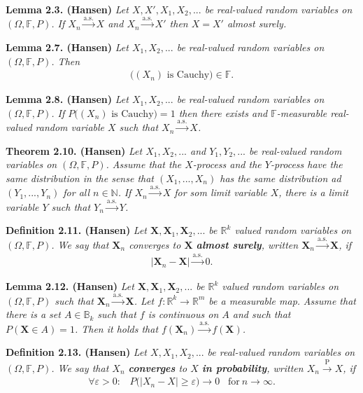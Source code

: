 \documentclass[a4paper,12pt,openany]{book}
\begin{document}
\textbf{Lemma 2.3. (Hansen)} \emph{Let \(X,X',X_1,X_2,...\) be real-valued random variables on \((\Omega,\mathbb{F},P)\). If \(X_n\stackrel{\text{a.s.}}{\to}X\) and \(X_n\stackrel{\text{a.s.}}{\to}X'\) then \(X=X'\) almost surely.}

\textbf{Lemma 2.7. (Hansen)} \emph{Let \(X_1,X_2,...\) be real-valued random variables on \((\Omega,\mathbb{F},P)\). Then}
\begin{align*}
    \Big((X_n)\text{ is Cauchy}\Big)\in \mathbb{F}.
\end{align*}

\textbf{Lemma 2.8. (Hansen)} \emph{Let \(X_1,X_2,...\) be real-valued random variables on \((\Omega,\mathbb{F},P)\). If \(P\Big((X_n)\text{ is Cauchy}\Big)=1\) then there exists and \(\mathbb{F}\)-measurable real-valued random variable \(X\) such that \(X_n\stackrel{\text{a.s.}}{\to}X\).}

\textbf{Theorem 2.10. (Hansen)} \emph{Let \(X_1,X_2,...\) and \(Y_1,Y_2,...\) be real-valued random variables on \((\Omega,\mathbb{F},P)\). Assume that the \(X\)-process and the \(Y\)-process have the same distribution in the sense that \((X_1,...,X_n)\) has the same distribution ad \((Y_1,...,Y_n)\) for all \(n\in\mathbb{N}\).}
\emph{If \(X_n\stackrel{\text{a.s.}}{\to}X\) for som limit variable \(X\), there is a limit variable \(Y\) such that \(Y_n\stackrel{\text{a.s.}}{\to}Y\).}

\textbf{Definition 2.11. (Hansen)} \emph{Let \(\mathbf{X},\mathbf{X}_1,\mathbf{X}_2,...\) be \(\mathbb{R}^k\) valued random variables on \((\Omega, \mathbb{F},P)\). We say that \(\mathbf{X}_n\) converges to \(\mathbf{X}\) \textbf{almost surely}, written \(\mathbf{X}_n\stackrel{\text{a.s.}}{\to}\mathbf{X}\), if}
\begin{align*}
    \vert\mathbf{X}_n-\mathbf{X}\vert \stackrel{\text{a.s.}}{\to} 0.\tag{2.15}
\end{align*}

\textbf{Lemma 2.12. (Hansen)} \emph{Let \(\mathbf{X},\mathbf{X}_1,\mathbf{X}_2,...\) be \(\mathbb{R}^k\) valued random variables on \((\Omega, \mathbb{F},P)\) such that \(\mathbf{X}_n\stackrel{\text{a.s.}}{\to}\mathbf{X}\). Let \(f : \mathbb{R}^k\to\mathbb{R}^m\) be a measurable map.}
\emph{Assume that there is a set \(A\in \mathbb{B}_k\) such that \(f\) is continuous on \(A\) and such that \(P(\mathbf{X}\in A)=1\). Then it holds that \(f(\mathbf{X}_n)\stackrel{\text{a.s.}}{\to} f(\mathbf{X})\).}

\textbf{Definition 2.13. (Hansen)} \emph{Let \(X,X_1,X_2,...\) be real-valued random variables on \((\Omega,\mathbb{F},P)\). We say that \(X_n\) \textbf{converges} to \(X\) \textbf{in probability}, written \(X_n\stackrel{\text{P}}{\to} X\), if}
\begin{align*}
    \forall \varepsilon>0 :\hspace{10pt} P\big(\vert X_n-X\vert\ge \varepsilon\big)\to 0\hspace{10pt}\text{for}\ n\to \infty.\tag{2.17}
\end{align*}
\end{document}
